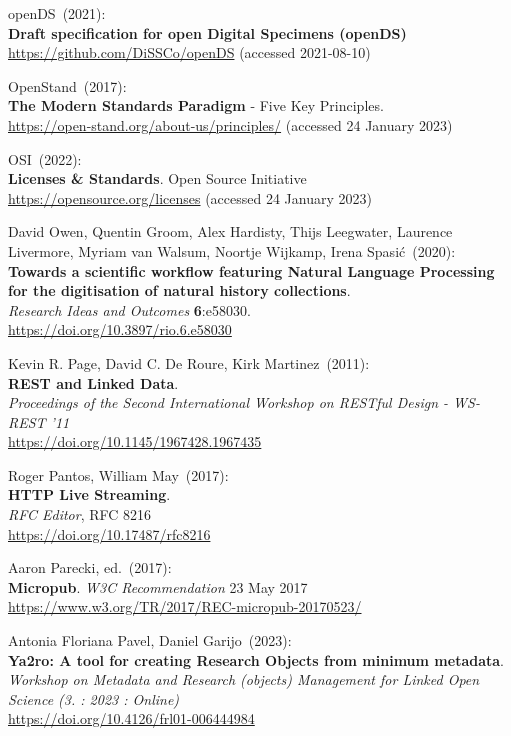 \begin{thebibliography}{9}
openDS~(2021): \\
\textbf{Draft specification for open Digital Specimens (openDS)}\\
\url{https://github.com/DiSSCo/openDS} (accessed 2021-08-10)

OpenStand~(2017): \\
\textbf{The {Modern Standards Paradigm}} - {Five Key Principles}.\\
\url{https://open-stand.org/about-us/principles/} (accessed 24 January
2023)

OSI~(2022): \\
\textbf{Licenses \& {Standards}}.
Open Source Initiative\\
\url{https://opensource.org/licenses} (accessed 24 January 2023)

David Owen, Quentin Groom, Alex Hardisty, Thijs Leegwater, Laurence Livermore, Myriam van Walsum, Noortje Wijkamp, Irena Spasić~(2020): \\
\textbf{Towards a scientific workflow featuring Natural
Language Processing for the digitisation of natural history collections}.\\
\emph{Research Ideas and Outcomes} \textbf{6}:e58030.\\
\url{https://doi.org/10.3897/rio.6.e58030}

Kevin R. Page, David C. De Roure, Kirk Martinez~(2011): \\
\textbf{{REST} and {Linked Data}}. \\
\emph{Proceedings of the {Second International Workshop} on {RESTful Design} - {WS-REST} '11} \\
\url{https://doi.org/10.1145/1967428.1967435}

Roger Pantos, William May~(2017): \\
\textbf{HTTP Live Streaming}. \\
\emph{RFC Editor}, RFC 8216\\
\url{https://doi.org/10.17487/rfc8216}

Aaron Parecki, ed.~(2017): \\
\textbf{Micropub}. 
\emph{W3C Recommendation} 23 May 2017\\
\url{https://www.w3.org/TR/2017/REC-micropub-20170523/}

Antonia Floriana Pavel, Daniel Garijo~(2023): \\
\textbf{Ya2ro: A tool for creating Research Objects from minimum metadata}.\\
\emph{Workshop on Metadata and Research (objects) Management for Linked Open Science (3. : 2023 : Online)}\\
\url{https://doi.org/10.4126/frl01-006444984}


\end{thebibliography}
